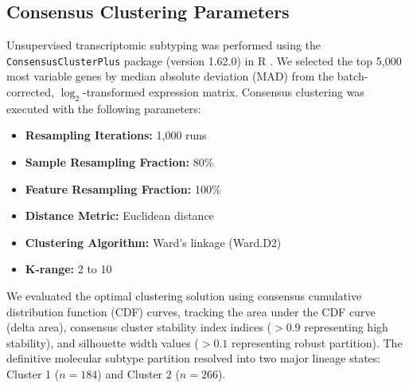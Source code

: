 \documentclass[11pt,a4paper]{article}
\begin{document}
\subsection{Consensus Clustering Parameters}
Unsupervised transcriptomic subtyping was performed using the \texttt{ConsensusClusterPlus} package (version 1.62.0) in R \cite{wilkerson2010consensuscluster}. We selected the top 5,000 most variable genes by median absolute deviation (MAD) from the batch-corrected, $\log_2$-transformed expression matrix. Consensus clustering was executed with the following parameters:
\begin{itemize}
    \item \textbf{Resampling Iterations:} 1,000 runs
    \item \textbf{Sample Resampling Fraction:} 80\%
    \item \textbf{Feature Resampling Fraction:} 100\%
    \item \textbf{Distance Metric:} Euclidean distance
    \item \textbf{Clustering Algorithm:} Ward's linkage (Ward.D2)
    \item \textbf{K-range:} 2 to 10
\end{itemize}
We evaluated the optimal clustering solution using consensus cumulative distribution function (CDF) curves, tracking the area under the CDF curve (delta area), consensus cluster stability index indices ($> 0.9$ representing high stability), and silhouette width values ($> 0.1$ representing robust partition). The definitive molecular subtype partition resolved into two major lineage states: Cluster 1 ($n=184$) and Cluster 2 ($n=266$).
\end{document}
